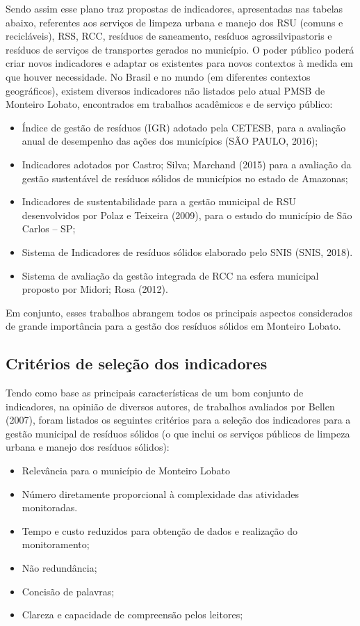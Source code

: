 	Sendo assim esse plano traz propostas de indicadores, apresentadas nas tabelas abaixo, referentes aos serviços de limpeza urbana e manejo dos RSU (comuns e recicláveis), RSS, RCC, resíduos de saneamento, resíduos agrossilvipastoris e resíduos de serviços de transportes gerados no município. O poder público poderá criar novos indicadores e adaptar os existentes para novos contextos à medida em que houver necessidade.
	No Brasil e no mundo (em diferentes contextos geográficos), existem diversos indicadores não listados pelo atual PMSB de Monteiro Lobato, encontrados em trabalhos acadêmicos e de serviço público:
	
	\begin{itemize}
		\item Índice de gestão de resíduos (IGR) adotado pela CETESB, para a avaliação anual de desempenho das ações dos municípios (SÃO PAULO, 2016);
		\item Indicadores adotados por Castro; Silva; Marchand (2015) para a avaliação da gestão sustentável de resíduos sólidos de municípios no estado de Amazonas;
		\item Indicadores de sustentabilidade para a gestão municipal de RSU desenvolvidos por Polaz e Teixeira (2009), para o estudo do município de São Carlos – SP;
		\item Sistema de Indicadores de resíduos sólidos elaborado pelo SNIS (SNIS, 2018).
		\item Sistema de avaliação da gestão integrada de RCC na esfera municipal proposto por Midori; Rosa (2012).
	\end{itemize}
	
	Em conjunto, esses trabalhos abrangem todos os principais aspectos considerados de grande importância para a gestão dos resíduos sólidos em Monteiro Lobato. 
	
	\subsection{Critérios de seleção dos indicadores}

	Tendo como base as principais características de um bom conjunto de indicadores, na opinião de diversos autores, de trabalhos avaliados por Bellen (2007), foram listados os seguintes critérios para a seleção dos indicadores para a gestão municipal de resíduos sólidos (o que inclui os serviços públicos de limpeza urbana e manejo dos resíduos sólidos):
	
	\begin{itemize}
		\item Relevância para o município de Monteiro Lobato
		\item Número diretamente proporcional à complexidade das atividades monitoradas.
		\item Tempo e custo reduzidos para obtenção de dados e realização do monitoramento;
		\item Não redundância;
		\item Concisão de palavras;
		\item Clareza e capacidade de compreensão pelos leitores;
	
	\end{itemize}

